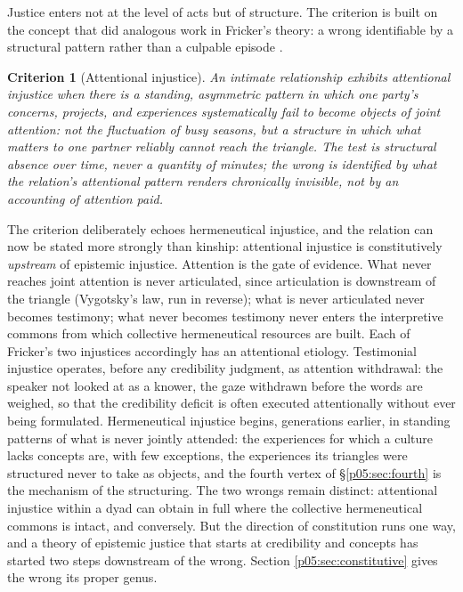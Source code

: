 \documentclass[11pt,a4paper]{article}
\theoremstyle{seriesthm}
\newtheorem{crit}{Criterion}
\begin{document}
Justice enters not at the level of acts but of structure. The criterion is built on the concept that did analogous work in Fricker's theory: a wrong identifiable by a structural pattern rather than a culpable episode \parencite{fricker2007}.

\begin{crit}[Attentional injustice]\label{p05:crit:attention}
An intimate relationship exhibits attentional injustice when there is a standing, asymmetric pattern in which one party's concerns, projects, and experiences systematically fail to become objects of joint attention: not the fluctuation of busy seasons, but a structure in which what matters to one partner reliably cannot reach the triangle. The test is structural absence over time, never a quantity of minutes; the wrong is identified by what the relation's attentional pattern renders chronically invisible, not by an accounting of attention paid.
\end{crit}

The criterion deliberately echoes hermeneutical injustice, and the relation can now be stated more strongly than kinship: attentional injustice is constitutively \emph{upstream} of epistemic injustice. Attention is the gate of evidence. What never reaches joint attention is never articulated, since articulation is downstream of the triangle (Vygotsky's law, run in reverse); what is never articulated never becomes testimony; what never becomes testimony never enters the interpretive commons from which collective hermeneutical resources are built. Each of Fricker's two injustices accordingly has an attentional etiology. Testimonial injustice operates, before any credibility judgment, as attention withdrawal: the speaker not looked at as a knower, the gaze withdrawn before the words are weighed, so that the credibility deficit is often executed attentionally without ever being formulated. Hermeneutical injustice begins, generations earlier, in standing patterns of what is never jointly attended: the experiences for which a culture lacks concepts are, with few exceptions, the experiences its triangles were structured never to take as objects, and the fourth vertex of §\ref{p05:sec:fourth} is the mechanism of the structuring. The two wrongs remain distinct: attentional injustice within a dyad can obtain in full where the collective hermeneutical commons is intact, and conversely. But the direction of constitution runs one way, and a theory of epistemic justice that starts at credibility and concepts has started two steps downstream of the wrong. Section \ref{p05:sec:constitutive} gives the wrong its proper genus.
\end{document}
